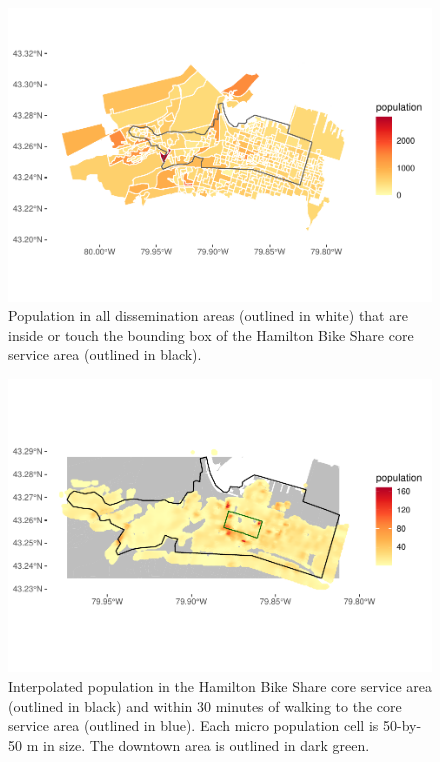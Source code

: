 \documentclass[]{elsarticle} %
\begin{document}
\begin{figure}

{\centering \includegraphics[width=0.9\linewidth]{Bike-share-spatial-equity_files/figure-latex/da-population-1} 

}

\caption{Population in all dissemination areas (outlined in white) that are inside or touch the bounding box of the Hamilton Bike Share core service area (outlined in black).}\label{fig:da-population}
\end{figure}

\begin{figure}

{\centering \includegraphics[width=0.9\linewidth]{Bike-share-spatial-equity_files/figure-latex/interpolated-population-1} 

}

\caption{Interpolated population in the Hamilton Bike Share core service area (outlined in black) and within 30 minutes of walking to the core service area (outlined in blue). Each micro population cell is 50-by-50 m in size. The downtown area is outlined in dark green.}\label{fig:interpolated-population}
\end{figure}
\end{document}
